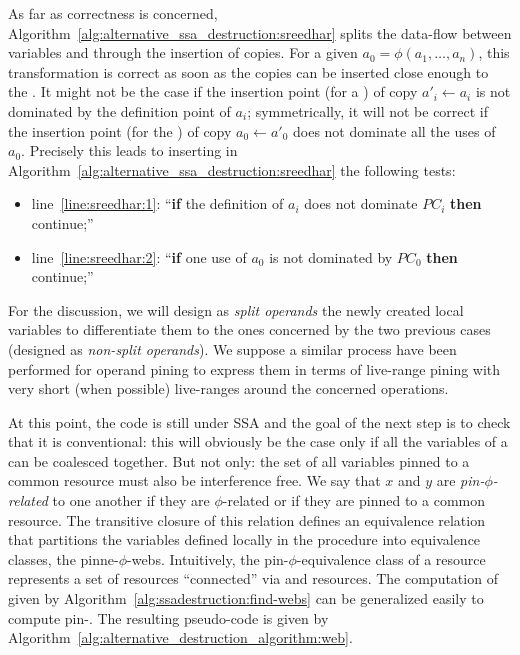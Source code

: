 As far as correctness is concerned, Algorithm~\ref{alg:alternative_ssa_destruction:sreedhar} splits the data-flow between variables and \phinodes through the insertion of copies. For a given \phifun $a_0=\phi(a_1,\dots,a_n)$, this transformation is correct as soon as the copies can be inserted close enough to the \phifun. It might not be the case if the insertion point (for a \useop) of copy $a'_i\gets a_i$ is not dominated by the definition point of $a_i$; symmetrically, it will not be correct if the insertion point (for the ) of copy $a_0\gets a'_0$ does not dominate all the uses of $a_0$. Precisely this leads to inserting in Algorithm~\ref{alg:alternative_ssa_destruction:sreedhar} the following tests:
\begin{itemize}
\item line~\ref{line:sreedhar:1}: ``{\bf if} the definition of $a_i$ does not dominate $PC_i$ {\bf then} continue;''
\item line~\ref{line:sreedhar:2}: ``{\bf if} one use of $a_0$ is not dominated by $PC_0$ {\bf then} continue;''
\end{itemize}
For the discussion, we will design as \emph{split operands} the newly created local variables to differentiate them to the ones concerned by the two previous cases (designed as \emph{non-split operands}).
% 
We suppose a similar process have been performed for operand pining to express them in terms of live-range pining with very short (when possible) live-ranges around the concerned operations. 

At this point, the code is still under SSA and the goal of the next step is to check that it is conventional: this will obviously be the case only if all the variables of a \phiweb can be coalesced together. But not only: the set of all variables pinned to a common resource must also be interference free. 
We say that $x$ and $y$ are \emph{pin-$\phi$-related} to one another if they are $\phi$-related or if they are pinned to a common resource. The transitive closure of this relation defines an equivalence relation that 
partitions the variables defined locally in the procedure into equivalence classes, the pinne-$\phi$-webs.
Intuitively, the pin-$\phi$-equivalence class of a resource represents a set of resources ``connected'' via \phifuns and resources.
The computation of \phiwebs given by Algorithm~\ref{alg:ssadestruction:find-webs} can be generalized easily to compute pin-\phiwebs. The resulting pseudo-code is given by Algorithm~\ref{alg:alternative_destruction_algorithm:web}. 

